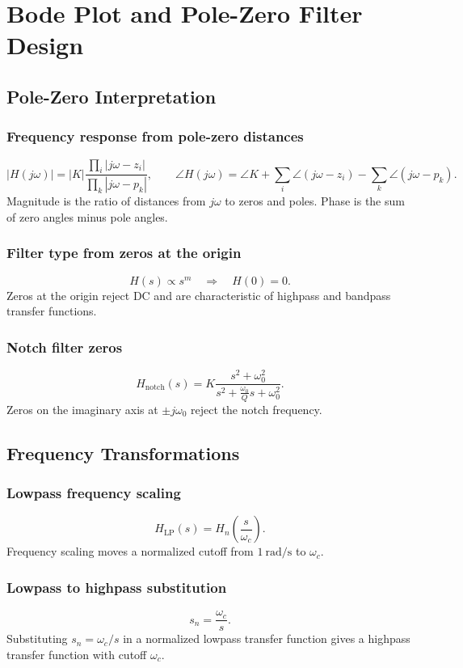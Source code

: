 \section{Bode Plot and Pole-Zero Filter Design}

\subsection{Pole-Zero Interpretation}

\subsubsection{Frequency response from pole-zero distances}
\[
|H(j\omega)|=|K|\frac{\prod_i|j\omega-z_i|}{\prod_k|j\omega-p_k|},
\qquad
\angle H(j\omega)=\angle K+\sum_i\angle(j\omega-z_i)-\sum_k\angle(j\omega-p_k).
\]
Magnitude is the ratio of distances from \(j\omega\) to zeros and poles. Phase is the sum of zero angles minus pole angles.

\subsubsection{Filter type from zeros at the origin}
\[
H(s)\propto s^m \quad \Rightarrow \quad H(0)=0.
\]
Zeros at the origin reject DC and are characteristic of highpass and bandpass transfer functions.

\subsubsection{Notch filter zeros}
\[
H_{\mathrm{notch}}(s)=K\frac{s^2+\omega_0^2}{s^2+\frac{\omega_0}{Q}s+\omega_0^2}.
\]
Zeros on the imaginary axis at \(\pm j\omega_0\) reject the notch frequency.

\subsection{Frequency Transformations}

\subsubsection{Lowpass frequency scaling}
\[
H_{\mathrm{LP}}(s)=H_n\!\left(\frac{s}{\omega_c}\right).
\]
Frequency scaling moves a normalized cutoff from \(1\ \mathrm{rad/s}\) to \(\omega_c\).

\subsubsection{Lowpass to highpass substitution}
\[
s_n=\frac{\omega_c}{s}.
\]
Substituting \(s_n=\omega_c/s\) in a normalized lowpass transfer function gives a highpass transfer function with cutoff \(\omega_c\).

